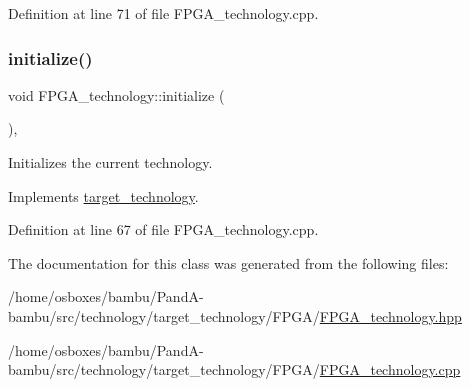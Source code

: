 Definition at line 71 of file F\+P\+G\+A\+\_\+technology.\+cpp.

\mbox{\label{classFPGA__technology_ae30c5de6f7aeb8b2e43d668a6c9ea774}} 
\subsubsection{\texorpdfstring{initialize()}{initialize()}}
{\footnotesize\ttfamily void F\+P\+G\+A\+\_\+technology\+::initialize (\begin{DoxyParamCaption}{ }\end{DoxyParamCaption})\hspace{0.3cm}{\ttfamily [override]}, {\ttfamily [virtual]}}



Initializes the current technology. 



Implements \hyperlink{classtarget__technology_a1fc1fd2d6ccfa9e748f54a4aeac33b51}{target\+\_\+technology}.



Definition at line 67 of file F\+P\+G\+A\+\_\+technology.\+cpp.



The documentation for this class was generated from the following files\+:\begin{DoxyCompactItemize}
\item 
/home/osboxes/bambu/\+Pand\+A-\/bambu/src/technology/target\+\_\+technology/\+F\+P\+G\+A/\hyperlink{FPGA__technology_8hpp}{F\+P\+G\+A\+\_\+technology.\+hpp}\item 
/home/osboxes/bambu/\+Pand\+A-\/bambu/src/technology/target\+\_\+technology/\+F\+P\+G\+A/\hyperlink{FPGA__technology_8cpp}{F\+P\+G\+A\+\_\+technology.\+cpp}\end{DoxyCompactItemize}
